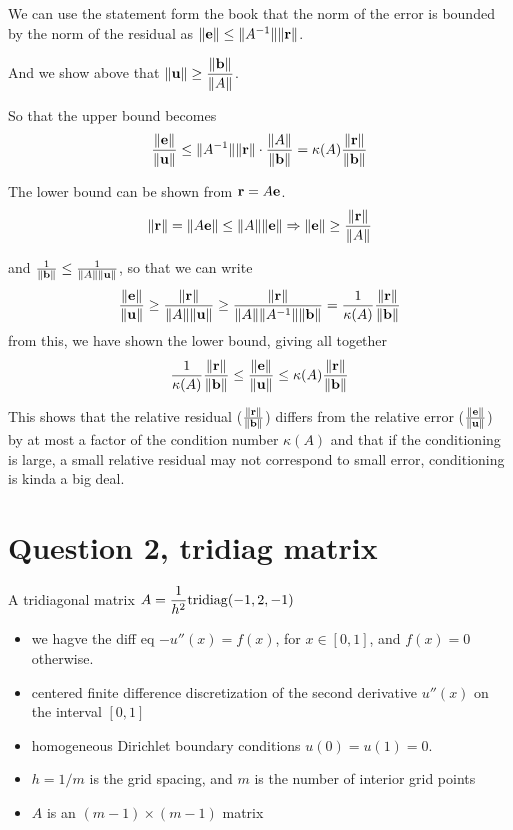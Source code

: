 \documentclass[12pt]{article}
\begin{document}
We can use the statement form the book that the norm of the error is bounded by the norm of the residual as $\|{\bf e}\| \leq \|A^{-1}\| \|{\bf r}\|$. 

And we show above that $\| {\bf u} \| \geq \dfrac{\|{\bf b}\|}{\|A\|}$.

So that the upper bound becomes
\begin{equation}
\dfrac{\|{\bf e}\|}{\|{\bf u}\|} \leq \|A^{-1}\| \|{\bf r}\| \cdot \dfrac{\|A\| }{\|{\bf b}\|}  = \kappa(A) \dfrac{\|{\bf r}\|}{\|{\bf b}\|}
\end{equation}

The lower bound can be shown from ${\bf r } = A {\bf e}$.
\begin{equation}
    \|{\bf r}\| = \|A {\bf e}\| \leq \|A\| \|{\bf e}\| \Rightarrow \|{\bf e}\| \geq \dfrac{\|{\bf r}\|}{\|A\|}
\end{equation}

and $\frac{1}{\|{\bf b}\|} \leq \frac{1}{\|A\| \|{\bf u}\|}$, so that we can write
\begin{equation}
    \dfrac{\|{\bf e}\|}{\|{\bf u}\|} \geq \dfrac{\|{\bf r}\|}{\|A\| \|{\bf u}\|} \geq \dfrac{\|{\bf r}\|}{\|A\| \|A^{-1}\| \|{\bf b}\|} = \dfrac{1}{\kappa(A)} \dfrac{\|{\bf r}\|}{\|{\bf b}\|}
\end{equation}
from this, we have shown the lower bound, giving all together
\begin{equation}
\dfrac{1}{\kappa(A)} \dfrac{\|{\bf r}\|}{\|{\bf b}\|} \leq \dfrac{\|{\bf e}\|}{\|{\bf u}\|} \leq \kappa(A) \dfrac{\|{\bf r}\|}{\|{\bf b}\|} 
\end{equation}

This shows that the relative residual ($\frac{\|{\bf r}\|}{\|{\bf b}\|}$) differs from the relative error ($\frac{\|{\bf e}\|}{\|{\bf u}\|}$) by at most a factor of the condition number $\kappa(A)$ and that if the conditioning is large, a small relative residual may not correspond to small error, conditioning is kinda a big deal.

\section{Question 2, tridiag matrix}

A tridiagonal matrix $A = \dfrac{1}{h^2} {\rm tridiag}(-1, 2, -1)$
\begin{itemize}
    \item we hagve the diff eq $-u''(x) = f(x)$, for $x \in [0, 1]$, and $f(x) = 0$ otherwise.
    \item centered finite difference discretization of the second derivative $u''(x)$ on the interval $[0, 1]$ 
    \item homogeneous Dirichlet boundary conditions $u(0) = u(1) = 0$.
    \item $h = 1/m$ is the grid spacing, and $m$ is the number of interior grid points
    \item $A$ is an $(m-1) \times (m-1)$ matrix
\end{itemize}
\end{document}
